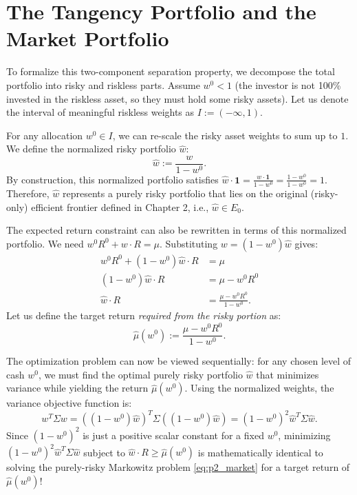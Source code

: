\section{The Tangency Portfolio and the Market Portfolio}

To formalize this two-component separation property, we decompose the total portfolio into risky and riskless parts. Assume $w^0 < 1$ (the investor is not 100\% invested in the riskless asset, so they must hold some risky assets). Let us denote the interval of meaningful riskless weights as $I := (-\infty, 1)$.

For any allocation $w^0 \in I$, we can re-scale the risky asset weights to sum up to $1$. We define the normalized risky portfolio $\hat{w}$:
\begin{equation*}
    \hat{w} := \frac{w}{1 - w^0}.
\end{equation*}
By construction, this normalized portfolio satisfies $\hat{w} \cdot \mathbf{1} = \frac{w \cdot \mathbf{1}}{1 - w^0} = \frac{1 - w^0}{1 - w^0} = 1$. Therefore, $\hat{w}$ represents a purely risky portfolio that lies on the original (risky-only) efficient frontier defined in Chapter 2, i.e., $\hat{w} \in E_0$.

The expected return constraint can also be rewritten in terms of this normalized portfolio. We need $w^0 R^0 + w \cdot R = \mu$. Substituting $w = (1 - w^0)\hat{w}$ gives:
\begin{align*}
    w^0 R^0 + (1 - w^0)\hat{w} \cdot R &= \mu \\
    (1 - w^0)\hat{w} \cdot R &= \mu - w^0 R^0 \\
    \hat{w} \cdot R &= \frac{\mu - w^0 R^0}{1 - w^0}.
\end{align*}
Let us define the target return \textit{required from the risky portion} as:
\begin{equation}
    \hat{\mu}(w^0) := \frac{\mu - w^0 R^0}{1 - w^0}.
\end{equation}

The optimization problem can now be viewed sequentially: for any chosen level of cash $w^0$, we must find the optimal purely risky portfolio $\hat{w}$ that minimizes variance while yielding the return $\hat{\mu}(w^0)$.
Using the normalized weights, the variance objective function is:
\begin{equation}
    w^T \Sigma w = ((1-w^0)\hat{w})^T \Sigma ((1-w^0)\hat{w}) = (1-w^0)^2 \hat{w}^T \Sigma \hat{w}. \label{eq:var_normalized}
\end{equation}
Since $(1-w^0)^2$ is just a positive scalar constant for a fixed $w^0$, minimizing $(1-w^0)^2 \hat{w}^T \Sigma \hat{w}$ subject to $\hat{w} \cdot R \ge \hat{\mu}(w^0)$ is mathematically identical to solving the purely-risky Markowitz problem \eqref{eq:p2_market} for a target return of $\hat{\mu}(w^0)$!

